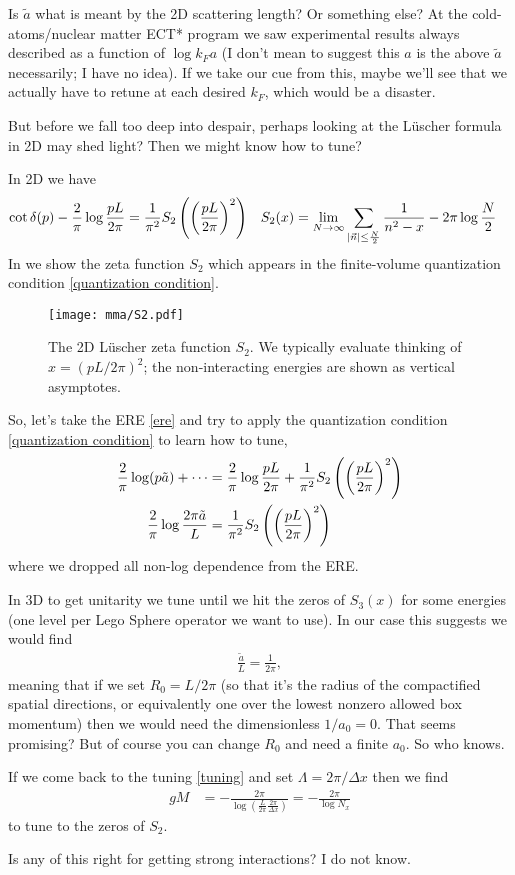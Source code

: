 Is $\tilde{a}$ what is meant by the 2D scattering length?  Or something else?
At the cold-atoms/nuclear matter ECT* program we saw experimental results always described as a function of $\log k_F a$ (I don't mean to suggest this $a$ is the above $\tilde{a}$ necessarily; I have no idea).
If we take our cue from this, maybe we'll see that we actually have to retune at each desired $k_F$, which would be a disaster.

But before we fall too deep into despair, perhaps looking at the L\"{u}scher formula in 2D may shed light?
Then we might know how to tune?

In 2D we have
\begin{align}
	\cot \delta(p) - \frac{2}{\pi} \log \frac{pL}{2\pi} &= \frac{1}{\pi^2} S_2\left(\left(\frac{pL}{2\pi}\right)^2\right)
	&	
	S_2(x) &= \lim_{N\rightarrow\infty} \sum_{\left| \vec{n} \right| \leq \frac{N}{2}} \frac{1}{n^2-x} - 2\pi \log \frac{N}{2}
	\label{eq:quantization condition}
\end{align}
In  we show the zeta function $S_2$ which appears in the finite-volume quantization condition \eqref{quantization condition}.
\begin{figure}
	\texttt{[image: mma/S2.pdf]}
	\caption{The 2D L\"{u}scher zeta function $S_2$.  We typically evaluate thinking of $x = (pL/2\pi)^2$; the non-interacting energies are shown as vertical asymptotes.}
	\label{fig:S2}
\end{figure}

So, let's take the ERE \eqref{ere} and try to apply the quantization condition \eqref{quantization condition} to learn how to tune,
\begin{align}
	\frac{2}{\pi} \log(p \tilde{a}) + \cdots
	&=
	\frac{2}{\pi} \log \frac{pL}{2\pi} + \frac{1}{\pi^2} S_2\left(\left(\frac{pL}{2\pi}\right)^2\right)
	\\
	\frac{2}{\pi} \log \frac{2\pi \tilde{a}}{L} &= \frac{1}{\pi^2} S_2\left(\left(\frac{pL}{2\pi}\right)^2\right)
\end{align}
where we dropped all non-log dependence from the ERE.

In 3D to get unitarity we tune until we hit the zeros of $S_3(x)$ for some energies (one level per Lego Sphere operator we want to use).
In our case this suggests we would find
\begin{align}
	\frac{\tilde{a}}{L} = \frac{1}{2\pi},
\end{align}
meaning that if we set $R_0=L/2\pi$ (so that it's the radius of the compactified spatial directions, or equivalently one over the lowest nonzero allowed box momentum) then we would need the dimensionless $1/a_0 = 0$.
That seems promising?
But of course you can change $R_0$ and need a finite $a_0$.
So who knows.

If we come back to the tuning \eqref{tuning} and set $\Lambda=2\pi/\Delta x$ then we find
\begin{align}
	gM &= - \frac{2\pi}{\log\left(\frac{L}{2\pi} \frac{2\pi}{\Delta x}\right)} = -\frac{2\pi}{\log N_x}
\end{align}
to tune to the zeros of $S_2$.

Is any of this right for getting strong interactions?  I do not know.
